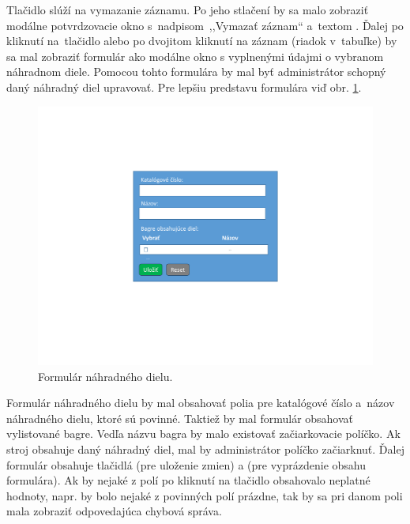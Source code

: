 Tlačidlo  slúží na vymazanie záznamu. Po jeho stlačení by sa malo zobraziť modálne potvrdzovacie okno s~nadpisom~,,Vymazať záznam`` a~textom . Ďalej po kliknutí na~tlačidlo  alebo po dvojitom kliknutí na záznam (riadok v~tabuľke) by sa mal zobraziť formulár ako modálne okno s vyplnenými údajmi o vybranom náhradnom diele. Pomocou tohto formulára by mal byť administrátor schopný daný náhradný diel upravovať. Pre lepšiu predstavu formulára viď obr. \ref{spare part form}.

\begin{figure}[H]\centering
\includegraphics[width=140mm]{../img/UI concept/spare part form}
\caption{Formulár náhradného dielu.}
\label{spare part form}
\end{figure}

Formulár náhradného dielu by mal obsahovať polia pre katalógové číslo a~názov náhradného dielu, ktoré sú povinné. Taktiež by mal formulár obsahovať vylistované bagre. Vedľa názvu bagra by malo existovať začiarkovacie políčko. Ak stroj obsahuje daný náhradný diel, mal by administrátor políčko začiarknuť. Ďalej formulár obsahuje tlačidlá  (pre uloženie zmien) a  (pre vyprázdenie obsahu formulára). Ak by nejaké z polí po kliknutí na tlačidlo  obsahovalo neplatné hodnoty, napr. by bolo nejaké z povinných polí prázdne, tak by sa pri danom poli mala zobraziť odpovedajúca chybová správa.


